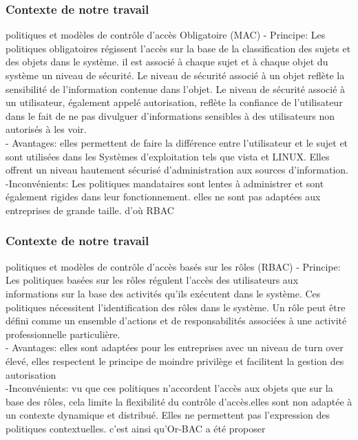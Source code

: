 \documentclass[10pt]{beamer}
\begin{document}
\begin{frame}
 \frametitle{Contexte de notre travail}
  \begin{block}{ politiques et modèles de contrôle d'accès Obligatoire (MAC)}
    - Principe: Les politiques obligatoires régissent l'accès sur la base de la classification des sujets et des objets dans le système. il est associé à chaque sujet et à chaque objet du système un niveau de sécurité. Le niveau de sécurité associé à un objet reflète la sensibilité de l'information contenue dans l'objet. Le niveau de sécurité associé à un utilisateur, également appelé autorisation, reflète la confiance de l'utilisateur dans le fait de ne pas divulguer d'informations sensibles à des utilisateurs non autorisés à les voir.  \\
    - Avantages: elles permettent de faire la différence entre l'utilisateur et le sujet et sont utilisées dans les Systèmes d'exploitation tels que vista et LINUX. Elles offrent un niveau hautement sécurisé d'administration aux sources d'information.\\
    -Inconvénients: Les politiques mandataires sont lentes à administrer et sont également rigides dans leur fonctionnement. elles ne sont pas adaptées aux entreprises de grande taille. d'où RBAC
  \end{block}
\end{frame}

\begin{frame}
 \frametitle{Contexte de notre travail}
  \begin{block}{ politiques et modèles de contrôle d'accès basés sur les rôles (RBAC)}
    - Principe: Les politiques basées sur les rôles régulent l'accès des utilisateurs aux informations sur la base des activités qu'ils exécutent dans le système. Ces politiques nécessitent l'identification des rôles dans le système. Un rôle peut être défini comme un ensemble d'actions et de responsabilités associées à une activité professionnelle particulière.  \\
    - Avantages: elles sont adaptées pour les entreprises avec un niveau de turn over élevé, elles respectent le principe de moindre privilège et facilitent la gestion des autorisation \\
    -Inconvénients: vu que ces politiques n'accordent l'accès aux objets que sur la base des rôles, cela limite la flexibilité du contrôle d'accès.elles sont non adaptée à un contexte dynamique et distribué. Elles ne permettent pas l'expression des politiques contextuelles. c'est ainsi qu'Or-BAC a été proposer
  \end{block}
\end{frame}
\end{document}
